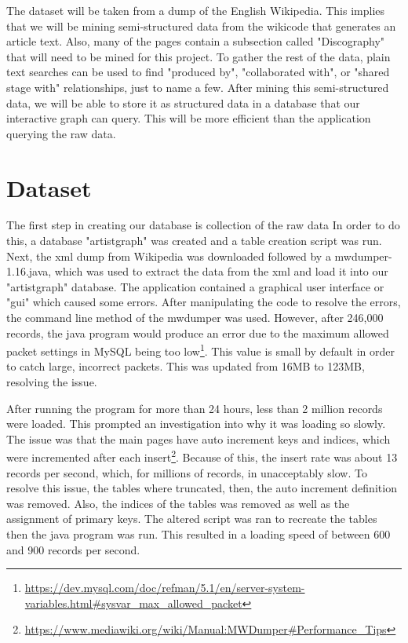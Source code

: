 \documentclass{sig-alternate}
\begin{document}
The dataset will be taken from a dump of the English Wikipedia. This implies 
that we will be mining semi-structured data from the wikicode that generates an 
article text. Also, many of the pages contain a subsection called "Discography" 
that will need to be mined for this project. To gather the rest of the data, 
plain text searches can be used to find "produced by", "collaborated with", 
or "shared stage with" relationships, just to name a few. After mining this 
semi-structured data, we will be able to store it as structured data in a database 
that our interactive graph can query. This will be more efficient than the 
application querying the raw data. 


\section{Dataset}
\label{dataset}

The first step in creating our database is collection of the raw data
In order to do this, a database "artistgraph" was created and a table creation
script was run. Next, the xml dump from Wikipedia was downloaded followed by a
mwdumper-1.16.java, which was used to extract the data from the xml and load it
into our "artistgraph" database. The application contained a graphical user interface
or "gui" which caused some errors. After manipulating the code to resolve the errors,
the command line method of the mwdumper was used. However, after 246,000 records, the 
java program would produce an error due to the maximum allowed packet settings in MySQL
being too low\footnote{\url{https://dev.mysql.com/doc/refman/5.1/en/server-system-variables.html#sysvar_max_allowed_packet}}.
This value is small by default in order to catch large, incorrect packets.
This was updated from 16MB to 123MB, resolving the issue.

After running the program
for more than 24 hours, less than 2 million records were loaded. This prompted an 
investigation into why it was loading so slowly. The issue was that the main pages
have auto increment keys and indices, which were incremented after each insert\footnote{\url{https://www.mediawiki.org/wiki/Manual:MWDumper#Performance_Tips}}.
Because of this, the insert rate was about 13 records per second, which, for
millions of records, in unacceptably slow. To resolve this issue, the tables
where truncated, then, the auto increment definition was removed. Also, the indices
of the tables was removed as well as the assignment of primary keys. The altered
script was ran to recreate the tables then the java program was run. This resulted
in a loading speed of between 600 and 900 records per second. 
\end{document}
